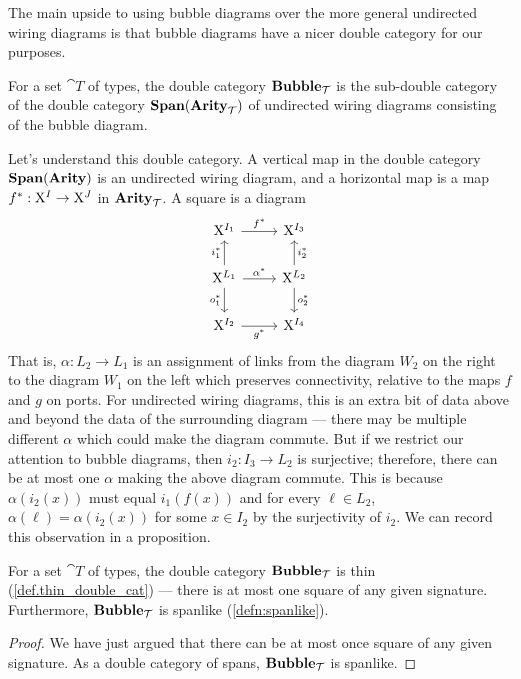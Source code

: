 \documentclass[DynamicalBook]{subfiles}
\begin{document}
The main upside to using bubble diagrams over the more general undirected wiring diagrams is that bubble diagrams have a nicer double category for our purposes.
      \begin{definition}\label{defn:bubble.diagram.cat}
        For a set $\cat{T}$ of types, the double category $\textbf{Bubble}_{{\mathcal{T}}}$ is the sub-double category of the double category $\textbf{Span}(\textbf{Arity}_{{\mathcal{T}}})$ of undirected wiring diagrams consisting of the bubble diagram.
    \end{definition}

    Let's understand this double category. A vertical map in the double category $\textbf{Span}(\textbf{Arity})$ is an undirected wiring diagram, and a horizontal map is a map $f^{\ast} : \mathrm{X}^{I} \to \mathrm{X}^{J}$ in $\textbf{Arity}_{\mathcal{T}}$. A square is a diagram
    \[
\begin{tikzcd}
	{\XX^{I_1}} & {\XX^{I_3}} \\
	{\XX^{L_1}} & {\XX^{L_2}} \\
	{\XX^{I_2}} & {\XX^{I_4}}
	\arrow["{f^{\ast}}", from=1-1, to=1-2]
	\arrow["{g^{\ast}}"', from=3-1, to=3-2]
	\arrow["{\alpha^{\ast}}", from=2-1, to=2-2]
	\arrow["{i^{\ast}_1}", from=2-1, to=1-1]
	\arrow["{o^{\ast}_1}"', from=2-1, to=3-1]
	\arrow["{i^{\ast}_2}"', from=2-2, to=1-2]
	\arrow["{o^{\ast}_2}", from=2-2, to=3-2]
\end{tikzcd}
    \]
That is, $\alpha : L_{2} \to L_{1}$ is an assignment of links from the diagram $W_{2}$ on the right to the diagram $W_{1}$ on the left which preserves connectivity, relative to the maps $f$ and $g$ on ports. For undirected wiring diagrams, this is an extra bit of data above and beyond the data of the surrounding diagram --- there may be multiple different $\alpha$ which could make the diagram commute. But if we restrict our attention to bubble diagrams, then $i_{2} : I_{3} \to L_{2}$ is surjective; therefore, there can be at most one $\alpha$ making the above diagram commute. This is because $\alpha(i_{2}(x))$ must equal $i_{1}(f(x))$ and for every $\ell \in L_{2}$, $\alpha(\ell) = \alpha(i_{2}(x))$ for some $x \in I_{2}$ by the surjectivity of $i_{2}$. We can record this observation in a proposition.
\begin{proposition}\label{prop:bubble.diag.thin.spanlike}
  For a set $\cat{T}$ of types, the double category $\textbf{Bubble}_{{\mathcal{T}}}$ is thin (\cref{def.thin_double_cat}) --- there is at most one square of any given signature. Furthermore, $\textbf{Bubble}_{{\mathcal{T}}}$ is spanlike (\cref{defn:spanlike}).
\end{proposition}
\begin{proof}
We have just argued that there can be at most once square of any given signature. As a double category of spans, $\textbf{Bubble}_{\mathcal{T}}$ is spanlike.
  \end{proof}
\end{document}
